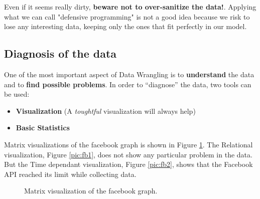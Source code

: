 \documentclass[a4paper,11pt,twoside]{article}
\begin{document}
Even if it seems really dirty, \textbf{beware not to over-sanitize the data!}. Applying what we can call "defensive programming" is not a good idea because we risk to lose any interesting data, keeping only the ones that fit perfectly in our model.

\subsection{Diagnosis of the data}

One of the most important aspect of Data Wrangling is to {\bf understand} the data and to {\bf find possible problems}. In order to ``diagnose'' the data, two tools can be used:
\begin{itemize}
 \item {\bf Visualization} (A {\it toughtful} visualization will always help)
 \item {\bf Basic Statistics} 
\end{itemize}

Matrix visualizations of the facebook graph is shown in Figure \ref{pic:fb}. The Relational visualization, Figure \ref{pic:fb1}, does not show any particular problem in the data. But the Time dependant visualization, Figure \ref{pic:fb2}, shows that the Facebook API reached its limit while collecting data.

\begin{figure} [h] %
\centerline{
}
\caption{\label{pic:fb} Matrix visualization of the facebook graph.} 
\end{figure}
\end{document}
